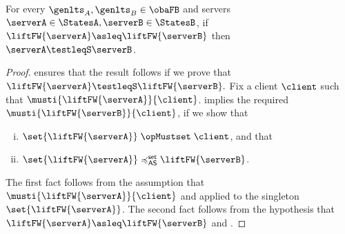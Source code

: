 \begin{proposition}[Soundness]
  \label{prop:bhv-soundness}
  For every $\genlts_A, \genlts_B \in \obaFB$ and
  servers $\serverA \in \StatesA, \serverB \in \StatesB $,
  if $\liftFW{ \serverA } \asleq \liftFW{ \serverB }$ then $\serverA \testleqS \serverB$.
\end{proposition}
\begin{proof}
 ensures that the result follows if we prove that
$\liftFW{\serverA} \testleqS \liftFW{\serverB}.$
Fix a client $\client$ such that $\musti{\liftFW{\serverA}}{\client}$.
 implies the required
$\musti{\liftFW{\serverB}}{\client}$, if we show that
\begin{enumerate}[(i)]
  \item $\mustset{ \set{ \liftFW{\serverA} } }{ \client }$, and that
  \item $\set{ \liftFW{ \serverA } } \mathrel{\preccurlyeq^{\mathsf{set}}_{\mathsf{AS}}} \liftFW{\serverB}$.
\end{enumerate}
The first fact follows from the assumption that $\musti{\liftFW{\serverA}}{\client}$
and  applied to the singleton
$\set{\liftFW{\serverA}}$.
The second fact follows from the hypothesis that $\liftFW{ \serverA }
\asleq \liftFW{ \serverB }$ and .
\end{proof}
